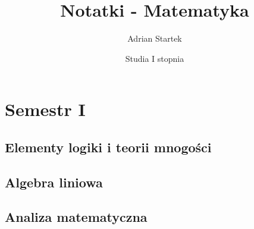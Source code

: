 \documentclass[fleqn]{book}
\title{Notatki - Matematyka}
\author{Adrian Startek}
\date{Studia I stopnia}
\begin{document}
    \frontmatter
    \maketitle
    \tableofcontents
    \mainmatter
    \part{Semestr I}
    \chapter{Elementy logiki i teorii mnogości}
    
    \chapter{Algebra liniowa}
    
    \chapter{Analiza matematyczna}
\end{document}
